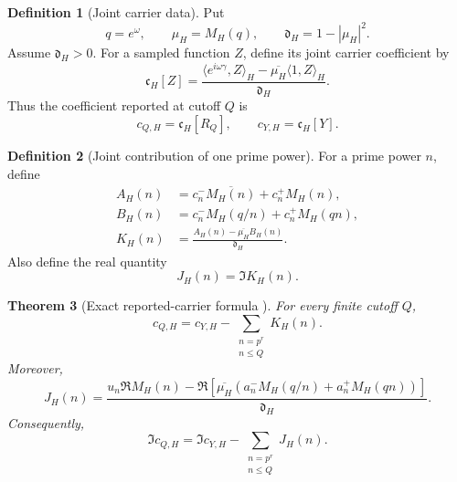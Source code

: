 \documentclass[11pt]{amsart}
\numberwithin{equation}{section}
\theoremstyle{plain}
\newtheorem{theorem}{Theorem}[section]
\theoremstyle{definition}
\newtheorem{definition}[theorem]{Definition}
\theoremstyle{remark}
\newcommand{\1}{\mathbf{1}}
\begin{document}
\begin{definition}[Joint carrier data]
\label{def:joint_carrier_data}
Put
\begin{equation}
q=e^\omega,
\qquad
\mu_H=M_H(q),
\qquad
\mathfrak d_H=1-|\mu_H|^2.
\label{eq:joint_carrier_data}
\end{equation}
Assume \(\mathfrak d_H>0\).  For a sampled function \(Z\), define its joint
carrier coefficient by
\begin{equation}
\mathfrak c_H[Z]
=
\frac{
\langle e^{i\omega\gamma},Z\rangle_H
-
\overline{\mu_H}\langle1,Z\rangle_H
}{
\mathfrak d_H
}.
\label{eq:joint_carrier_functional}
\end{equation}
Thus the coefficient reported at cutoff \(Q\) is
\begin{equation}
c_{Q,H}=\mathfrak c_H[R_Q],
\qquad
c_{Y,H}=\mathfrak c_H[Y].
\label{eq:joint_carrier_reported_definition}
\end{equation}
\end{definition}

\begin{definition}[Joint contribution of one prime power]
\label{def:joint_prime_increment}
For a prime power \(n\), define
\begin{align}
A_H(n)
&=
c_n^-\overline{M_H(n)}+c_n^+M_H(n),
\label{eq:joint_AH_definition}
\\
B_H(n)
&=
c_n^-M_H(q/n)+c_n^+M_H(qn),
\label{eq:joint_BH_definition}
\\
K_H(n)
&=
\frac{A_H(n)-\overline{\mu_H}B_H(n)}
{\mathfrak d_H}.
\label{eq:joint_KH_definition}
\end{align}
Also define the real quantity
\begin{equation}
J_H(n)
=
\Im K_H(n).
\label{eq:joint_JH_definition}
\end{equation}
\end{definition}


\begin{theorem}[Exact reported-carrier formula {}]
\label{thm:exact_joint_carrier_formula}
For every finite cutoff \(Q\),
\begin{equation}
\boxed{
c_{Q,H}
=
c_{Y,H}
-
\sum_{\substack{n=p^r\\n\leq Q}}K_H(n).
}
\label{eq:exact_joint_carrier_formula}
\end{equation}
Moreover,
\begin{equation}
\boxed{
J_H(n)
=
\frac{
u_n\Re M_H(n)
-
\Re\!\left[
\overline{\mu_H}
\left(
a_n^-M_H(q/n)+a_n^+M_H(qn)
\right)
\right]
}{
\mathfrak d_H
}.
}
\label{eq:joint_JH_explicit}
\end{equation}
Consequently,
\begin{equation}
\boxed{
\Im c_{Q,H}
=
\Im c_{Y,H}
-
\sum_{\substack{n=p^r\\n\leq Q}}J_H(n).
}
\label{eq:exact_joint_imaginary_formula}
\end{equation}
\end{theorem}
\end{document}
